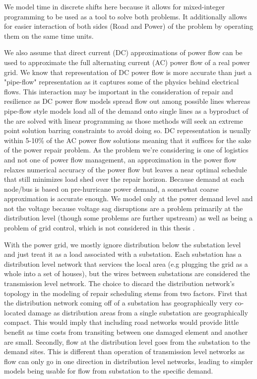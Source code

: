 \documentclass{article}
\begin{document}
	We model time in discrete shifts here because it allows for mixed-integer programming to be used as a tool to solve both problems. It additionally allows for easier interaction of both sides (Road and Power) of the problem by operating them on the same time units. 
	
	We also assume that direct current (DC) approximations of power flow can be used to approximate the full alternating current (AC) power flow of a real power grid. We know that representation of DC power flow is more accurate than just a "pipe-flow" representation as it captures some of the physics behind electrical flows. This interaction may be important in the consideration of repair and resilience as DC power flow models spread flow out among possible lines whereas pipe-flow style models load all of the demand onto single lines as a byproduct of the are solved with linear programming as those methods will seek an extreme point solution barring constraints to avoid doing so. DC representation is usually within 5-10\% of the AC power flow solutions \cite{Frank2016} \cite{StottEA2009} meaning that it suffices for the sake of the power repair problem. As the problem we're considering is one of logistics and not one of power flow management, an approximation in the power flow relaxes numerical accuracy of the power flow but leaves a near optimal schedule that still minimizes load shed over the repair horizon. Because demand at each node/bus is based on pre-hurricane power demand, a somewhat coarse approximation is accurate enough. We model only at the power demand level and not the voltage because voltage sag disruptions are a problem primarily at the distribution level (though some problems are further upstream) \cite{LamoreeEA1994} as well as being a problem of grid control, which is not considered in this thesis \cite{MiretEA2013}.  
	
	With the power grid, we mostly ignore distribution below the substation level and just treat it as a load associated with a substation. Each substation has a distribution level network that services the local area (e.g plugging the grid as a whole into a set of houses), but the wires between substations are considered the transmission level network. The choice to discard the distribution network's topology in the modeling of repair scheduling stems from two factors. First that the distribution network coming off of a substation has geographically very co-located damage as distribution areas from a single substation are geographically compact. This would imply that including road networks would provide little benefit as time costs from transiting between one damaged element and another are small. Secondly, flow at the distribution level goes from the substation to the demand sites. This is different than operation of transmission level networks as flow can only go in one direction in distribution level networks, leading to simpler models being usable for flow from substation to the specific demand.
\end{document}
